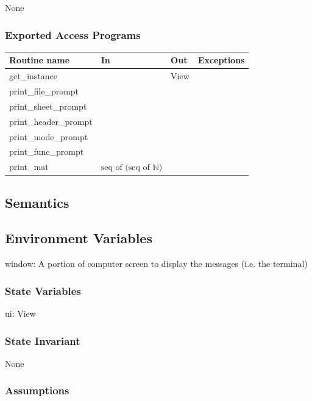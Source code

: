 \documentclass[12pt]{article}
\begin{document}
None

\subsubsection* {Exported Access Programs}

\begin{tabular}{| l | l | l | p{5cm} |}
  \hline
  \textbf{Routine name} & \textbf{In} & \textbf{Out} & \textbf{Exceptions}\\
  \hline
  get\_instance &  & View & \\
  \hline
  print\_file\_prompt & &  & \\
  \hline
  print\_sheet\_prompt & & & \\
  \hline
  print\_header\_prompt & & & \\
  \hline
  print\_mode\_prompt & & & \\
  \hline
  print\_func\_prompt & & & \\
  \hline
  print\_mat & $\text{seq of (seq of } \mathbb{N} \text{)}$ & & \\
  \hline

\end{tabular}

\subsection* {Semantics}

\subsection*{Environment Variables}

window: A portion of computer screen to display the messages (i.e. the terminal)

\subsubsection* {State Variables}

ui: View

\subsubsection* {State Invariant}

None

\subsubsection* {Assumptions}
\end{document}
